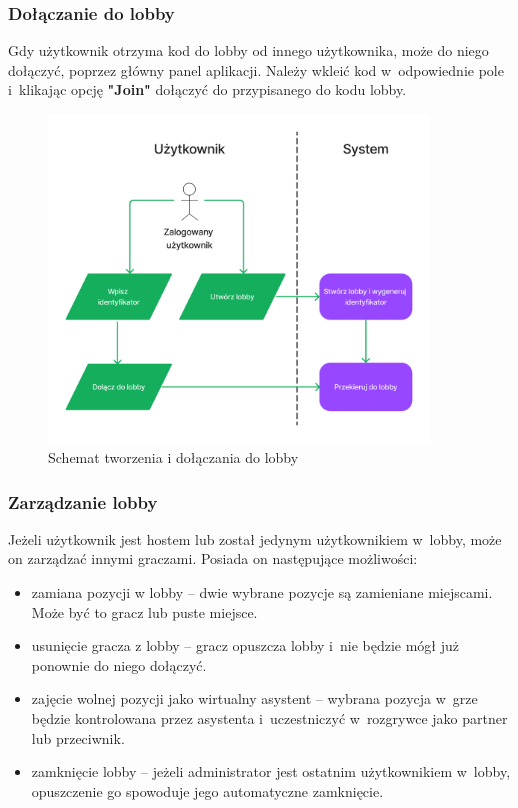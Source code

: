 \subsubsection{Dołączanie do lobby}

Gdy użytkownik otrzyma kod do lobby od innego użytkownika, może
do niego dołączyć, poprzez główny panel aplikacji. Należy wkleić
kod w~odpowiednie pole i~klikając opcję \textbf{"Join"}
dołączyć do przypisanego do kodu lobby.

\begin{figure}[hbt!]
  \centering
  \includegraphics[width=0.9\textwidth]{img/schematy/create_join_lobby.png}
  \caption{Schemat tworzenia i dołączania do lobby}
\end{figure}

\FloatBarrier


\subsubsection{Zarządzanie lobby}

Jeżeli użytkownik jest hostem lub został jedynym
użytkownikiem w~lobby, może on zarządzać innymi graczami.
Posiada on następujące możliwości:
\begin{itemize}
  \item zamiana pozycji w lobby -- dwie wybrane pozycje są zamieniane miejscami.
        Może być to gracz lub puste miejsce.
  \item usunięcie gracza z lobby -- gracz opuszcza lobby i~nie będzie
        mógł już ponownie do niego dołączyć.
  \item zajęcie wolnej pozycji jako wirtualny asystent -- wybrana pozycja
        w~grze będzie kontrolowana przez asystenta
        i~uczestniczyć w~rozgrywce jako partner lub przeciwnik.
  \item zamknięcie lobby -- jeżeli administrator jest ostatnim
        użytkownikiem w~lobby, opuszczenie go spowoduje jego automatyczne
        zamknięcie.

\end{itemize}

